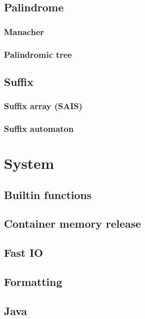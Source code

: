 \documentclass[titlepage,a4paper,10pt]{article}
\begin{document}
\begin{multicols}{2}
\begin{spacing}{0.8}
{			\subsection{Palindrome}
				\subsubsection{Manacher}
					
				\subsubsection{Palindromic tree}
					
			\subsection{Suffix}
				\subsubsection{Suffix array (SAIS)}
					
				\subsubsection{Suffix automaton}
					
		\section{System}
			\subsection{Builtin functions}
				
			\subsection{Container memory release}
				
			\subsection{Fast IO}
				
			\subsection{Formatting}
				
			\subsection{Java}
				
}
\end{spacing}
\end{multicols}
\end{document}
